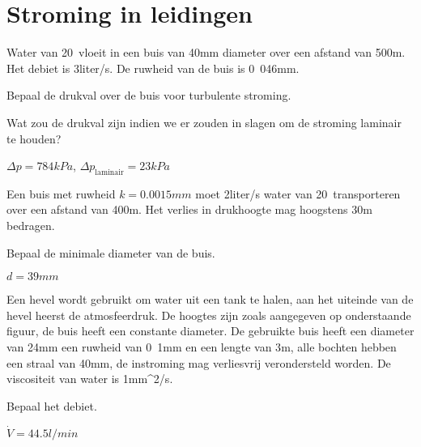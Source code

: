 \FloatBarrier
\chapter{Stroming in leidingen}
\label{sec:Stroming in leidingen}
\begin{toepassing}
	\label{buis}
	Water van 20\textcelsius\ vloeit in een buis van \unit{40}{mm} diameter over een afstand van \unit{500}{m}. Het debiet is \unit{3}{liter/s}.  De ruwheid van de buis is \unit{0.046}{mm}.
		
	Bepaal de drukval over de buis voor turbulente stroming.
		
	Wat zou de drukval zijn indien we er zouden in slagen om de stroming laminair te houden?
\end{toepassing}
\begin{antwoord}
	$\Delta p = \unit{784}{kPa}$, $\Delta p_{\text{laminair}} = \unit{23}{kPa}$
\end{antwoord}
\begin{toepassing*}
	\label{buisdiameter}
	Een buis met ruwheid $k = \unit{0.0015}{mm}$ moet \unit{2}{liter/s} water van 20\textcelsius\ transporteren over een afstand van \unit{400}{m}.  Het verlies in drukhoogte mag hoogstens \unit{30}{m} bedragen.
		
	Bepaal de minimale diameter van de buis.
\end{toepassing*}
\begin{antwoord}
	$d = \unit{39}{mm}$
\end{antwoord}
\begin{toepassing*}
	\label{hevel met verlies}
	Een hevel wordt gebruikt om water uit een tank te halen, aan het uiteinde van de hevel heerst de atmosfeerdruk. De hoogtes zijn zoals aangegeven op onderstaande figuur, de buis heeft een constante diameter. De gebruikte buis heeft een diameter van \unit{24}{mm} een ruwheid van \unit{0.1}{mm} en een lengte van \unit{3}{m}, alle bochten hebben een straal van \unit{40}{mm}, de instroming mag verliesvrij verondersteld worden. De viscositeit van water is \unit{1}{mm^2/s}.
		
	Bepaal het debiet.
	\begin{center}
		
	\end{center}
\end{toepassing*}
\begin{antwoord}
	$\dot{V} = \unit{44.5}{l/min}$
\end{antwoord}
